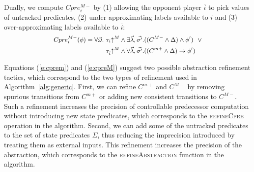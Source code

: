 \documentclass{book}
\newcommand{\abstractM}[1]{#1\mathord{\uparrow^M}}
\newcommand{\vect}[1]{\vec{#1}}
\theoremstyle{definition}
\begin{document}
Dually, we compute $Cpre_i^{M-}$ by (1) allowing the opponent 
player $\overline{i}$ to pick values of untracked predicates, (2) 
under-approximating labels available to $i$ and (3) 
over-approximating labels available to $\overline{i}$:
\begin{equation}
    \small
    \label{e:cpreM}
\begin{aligned}
    Cpre_i^{M-}(\phi) = \forall \vect{\omega}.~&\abstractM{\tau_i}         \land \exists \vect{\lambda},\vect{\sigma'}. ((C^{M-} \land \Delta) \land \phi')
                                             ~~\lor\\
                                               &\abstractM{\tau_{\overline{i}}} \land \forall \vect{\lambda},\vect{\sigma'}. ((C^{m+} \land \Delta) \rightarrow \phi')
\end{aligned}
\end{equation}

Equations (\ref{e:cprem}) and (\ref{e:cpreM}) suggest two possible 
abstraction refinement tactics, which correspond to the two types 
of refinement used in Algorithm~\ref{alg:generic}.  First, we can 
refine $C^{m+}$ and $C^{M-}$ by removing spurious transitions from 
$C^{m+}$ or adding new consistent transitions to $C^{M-}$.  Such a 
refinement increases the precision of controllable predecessor 
computation without introducing new state predicates, which 
corresponds to the \textsc{refineCpre} operation in the algorithm.  
Second, we can add some of the untracked predicates to the set of 
state predicates $\Sigma$, thus reducing the imprecision 
introduced by treating them as external inputs.  This refinement 
increases the precision of the abstraction, which corresponds to 
the \textsc{refineAbstraction} function in the algorithm.
\end{document}
